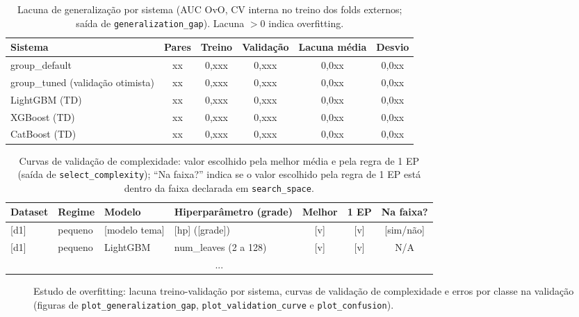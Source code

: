 \documentclass[11pt,a4paper]{article}
\begin{document}
\begin{table}[h]
\centering
\caption{Lacuna de generalização por sistema (AUC OvO, CV interna no treino dos folds externos; saída de \texttt{generalization\_gap}). Lacuna $> 0$ indica overfitting.}
\label{tab:lacuna}
\footnotesize
\begin{tabular}{l c c c c c}
\toprule
\textbf{Sistema} & \textbf{Pares} & \textbf{Treino} & \textbf{Validação} & \textbf{Lacuna média} & \textbf{Desvio} \\
\midrule
group\_default & xx & 0,xxx & 0,xxx & 0,0xx & 0,0xx \\
group\_tuned (validação otimista) & xx & 0,xxx & 0,xxx & 0,0xx & 0,0xx \\
LightGBM (TD) & xx & 0,xxx & 0,xxx & 0,0xx & 0,0xx \\
XGBoost (TD)  & xx & 0,xxx & 0,xxx & 0,0xx & 0,0xx \\
CatBoost (TD) & xx & 0,xxx & 0,xxx & 0,0xx & 0,0xx \\
\bottomrule
\end{tabular}
\end{table}

\begin{table}[h]
\centering
\caption{Curvas de validação de complexidade: valor escolhido pela melhor média e pela regra de 1 EP (saída de \texttt{select\_complexity}); ``Na faixa?'' indica se o valor escolhido pela regra de 1 EP está dentro da faixa declarada em \texttt{search\_space}.}
\label{tab:curvas}
\footnotesize
\setlength{\tabcolsep}{4pt}
\begin{tabular}{l l l l c c c}
\toprule
\textbf{Dataset} & \textbf{Regime} & \textbf{Modelo} & \textbf{Hiperparâmetro (grade)} & \textbf{Melhor} & \textbf{1 EP} & \textbf{Na faixa?} \\
\midrule
{}[d1] & pequeno & [modelo tema] & [hp] ([grade]) & [v] & [v] & [sim/não] \\
{}[d1] & pequeno & LightGBM & num\_leaves (2 a 128) & [v] & [v] & N/A \\
\multicolumn{7}{c}{...} \\
\bottomrule
\end{tabular}
\end{table}

\begin{figure}[h]
\centering
\caption{Estudo de overfitting: lacuna treino-validação por sistema, curvas de validação de complexidade e erros por classe na validação (figuras de \texttt{plot\_generalization\_gap}, \texttt{plot\_validation\_curve} e \texttt{plot\_confusion}).}
\label{fig:overfitting}
\end{figure}
\end{document}
